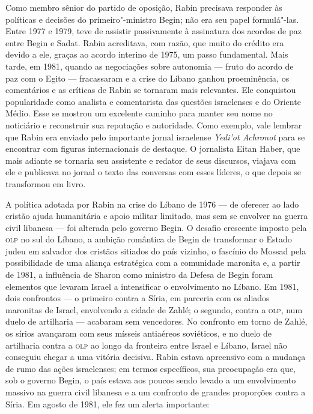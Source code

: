 Como membro sênior do partido de oposição, Rabin precisava responder às
políticas e decisões do primeiro"-ministro Begin; não era seu papel
formulá"-las. Entre 1977 e 1979, teve de assistir passivamente à
assinatura dos acordos de paz entre Begin e Sadat. Rabin acreditava, com
razão, que muito do crédito era devido a ele, graças ao acordo interino
de 1975, um passo fundamental. Mais tarde, em 1981, quando as
negociações sobre autonomia --- fruto do acordo de paz com o Egito ---
fracassaram e a crise do Líbano ganhou proeminência, os comentários e as
críticas de Rabin se tornaram mais relevantes. Ele conquistou
popularidade como analista e comentarista das questões israelenses e do
Oriente Médio. Esse se mostrou um excelente caminho para manter seu nome
no noticiário e reconstruir sua reputação e autoridade. Como exemplo,
vale lembrar que Rabin era enviado pelo importante jornal israelense
\textit{Yedi'ot Achronot} para se encontrar com figuras internacionais de
destaque. O jornalista Eitan Haber, que mais adiante se tornaria seu
assistente e redator de seus discursos, viajava com ele e publicava no
jornal o texto das conversas com esses líderes, o que depois se
transformou em livro.

A política adotada por Rabin na crise do Líbano de 1976
--- de oferecer ao lado cristão ajuda humanitária e apoio militar
limitado, mas sem se envolver na guerra civil libanesa --- foi alterada
pelo governo Begin. O desafio crescente imposto pela \textsc{olp} no sul do
Líbano, a ambição romântica de Begin de transformar o Estado judeu em
salvador dos cristãos sitiados do país vizinho, o fascínio do Mossad
pela possibilidade de uma aliança estratégica com a comunidade maronita
e, a partir de 1981, a influência de Sharon como ministro da Defesa de
Begin foram elementos que levaram Israel a intensificar o envolvimento
no Líbano. Em 1981, dois confrontos --- o primeiro contra a Síria, em
parceria com os aliados maronitas de Israel, envolvendo a cidade de
Zahlé; o segundo, contra a \textsc{olp}, num duelo de artilharia --- acabaram sem
vencedores. No confronto em torno de Zahlé, os sírios avançaram com seus
mísseis antiaéreos soviéticos, e no duelo de artilharia contra a \textsc{olp} ao
longo da fronteira entre Israel e Líbano, Israel não conseguiu chegar a
uma vitória decisiva. Rabin estava apreensivo com a mudança de rumo das
ações israelenses; em termos específicos, sua preocupação era que, sob o
governo Begin, o país estava aos poucos sendo levado a um envolvimento
massivo na guerra civil libanesa e a um confronto de grandes proporções
contra a Síria. Em agosto de 1981, ele fez um alerta importante:

